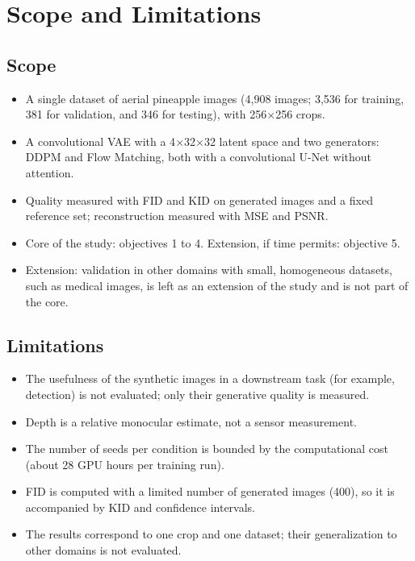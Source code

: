 \section{Scope and Limitations}

\subsection{Scope}

\begin{itemize}
  \item A single dataset of aerial pineapple images (4,908 images; 3,536 for training, 381 for validation, and 346 for testing), with 256$\times$256 crops.
  \item A convolutional VAE with a 4$\times$32$\times$32 latent space and two generators: DDPM and Flow Matching, both with a convolutional U-Net without attention.
  \item Quality measured with FID and KID on generated images and a fixed reference set; reconstruction measured with MSE and PSNR.
  \item Core of the study: objectives 1 to 4. Extension, if time permits: objective 5.
  \item Extension: validation in other domains with small, homogeneous datasets, such as medical images, is left as an extension of the study and is not part of the core.
\end{itemize}

\subsection{Limitations}

\begin{itemize}
  \item The usefulness of the synthetic images in a downstream task (for example, detection) is not evaluated; only their generative quality is measured.
  \item Depth is a relative monocular estimate, not a sensor measurement.
  \item The number of seeds per condition is bounded by the computational cost (about 28 GPU hours per training run).
  \item FID is computed with a limited number of generated images (400), so it is accompanied by KID and confidence intervals.
  \item The results correspond to one crop and one dataset; their generalization to other domains is not evaluated.
\end{itemize}
